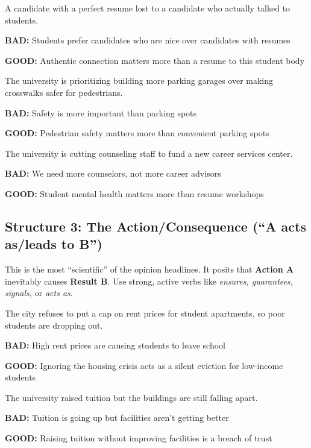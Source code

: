 \documentclass[12pt]{article}
\newcommand{\bad}[1]{\textbf{\textcolor{rose}{BAD:}} #1}
\newcommand{\good}[1]{\textbf{\textcolor{congaree}{GOOD:}} #1}
\newcommand{\context}[1]{#1}
\begin{document}
\begin{exampleblock}
\context{A candidate with a perfect resume lost to a candidate who actually talked to students.}

\bad{Students prefer candidates who are nice over candidates with resumes}

\good{Authentic connection matters more than a resume to this student body}
\end{exampleblock}

\begin{exampleblock}
\context{The university is prioritizing building more parking garages over making crosswalks safer for pedestrians.}

\bad{Safety is more important than parking spots}

\good{Pedestrian safety matters more than convenient parking spots}
\end{exampleblock}

\begin{exampleblock}
\context{The university is cutting counseling staff to fund a new career services center.}

\bad{We need more counselors, not more career advisors}

\good{Student mental health matters more than resume workshops}
\end{exampleblock}

\newpage
\subsection{Structure 3: The Action/Consequence (``A acts as/leads to B'')}
This is the most ``scientific'' of the opinion headlines. It posits that \textbf{Action A} inevitably causes \textbf{Result B}. Use strong, active verbs like \textit{ensures, guarantees, signals,} or \textit{acts as}.

\begin{exampleblock}
\context{The city refuses to put a cap on rent prices for student apartments, so poor students are dropping out.}

\bad{High rent prices are causing students to leave school}

\good{Ignoring the housing crisis acts as a silent eviction for low-income students}
\end{exampleblock}

\begin{exampleblock}
\context{The university raised tuition but the buildings are still falling apart.}

\bad{Tuition is going up but facilities aren't getting better}

\good{Raising tuition without improving facilities is a breach of trust}
\end{exampleblock}
\end{document}
